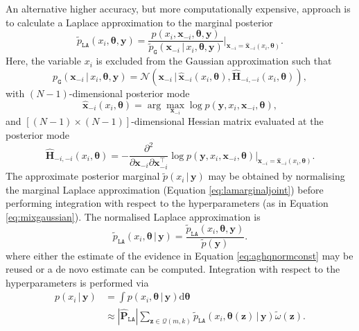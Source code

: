 \documentclass[a4paper, nobind]{templates/ociamthesis}
\begin{document}
An alternative higher accuracy, but more computationally expensive, approach is to calculate a Laplace approximation to the marginal posterior
\begin{equation}
\tilde p_\texttt{LA}(x_i, \boldsymbol{\mathbf{\theta}}, \mathbf{y}) = \frac{p(x_i, \mathbf{x}_{-i}, \boldsymbol{\mathbf{\theta}}, \mathbf{y})}{\tilde p_\texttt{G}(\mathbf{x}_{-i} \, | \, x_i, \boldsymbol{\mathbf{\theta}}, \mathbf{y})} \Big\rvert_{\mathbf{x}_{-i} = \hat{\mathbf{x}}_{-i}(x_i, \boldsymbol{\mathbf{\theta}})}. \label{eq:lamarginaljoint}
\end{equation}
Here, the variable \(x_i\) is excluded from the Gaussian approximation such that
\begin{equation}
p_\texttt{G}(\mathbf{x}_{-i} \, | \, x_i, \boldsymbol{\mathbf{\theta}}, \mathbf{y}) = \mathcal{N}(\mathbf{x}_{-i} \, | \, \hat{\mathbf{x}}_{-i}(x_i, \boldsymbol{\mathbf{\theta}}), \hat{\mathbf{H}}_{-i, -i}(x_i, \boldsymbol{\mathbf{\theta}})),
\end{equation}
with \((N - 1)\)-dimensional posterior mode
\begin{equation}
\hat{\mathbf{x}}_{-i}(x_i, \boldsymbol{\mathbf{\theta}}) = \arg\max_{\mathbf{x}_{-i}} \log p(\mathbf{y}, x_i, \mathbf{x}_{-i}, \boldsymbol{\mathbf{\theta}}),
\end{equation}
and \([(N - 1) \times (N - 1)]\)-dimensional Hessian matrix evaluated at the posterior mode
\begin{equation}
\hat{\mathbf{H}}_{-i, -i}(x_i, \boldsymbol{\mathbf{\theta}}) = - \frac{\partial^2}{\partial \mathbf{x}_{-i} \partial \mathbf{x}_{-i}^\top} \log p(\mathbf{y}, x_i, \mathbf{x}_{-i}, \boldsymbol{\mathbf{\theta}}) \rvert_{\mathbf{x}_{-i} = \hat{\mathbf{x}}_{-i}(x_i, \boldsymbol{\mathbf{\theta}})}.
\end{equation}
The approximate posterior marginal \(\tilde p(x_i \, | \, \mathbf{y})\) may be obtained by normalising the marginal Laplace approximation (Equation \eqref{eq:lamarginaljoint}) before performing integration with respect to the hyperparameters (as in Equation \eqref{eq:mixgaussian}).
The normalised Laplace approximation is
\begin{equation}
\tilde p_\texttt{LA}(x_i, \boldsymbol{\mathbf{\theta}} \, | \, \mathbf{y}) = \frac{\tilde p_\texttt{LA}(x_i, \boldsymbol{\mathbf{\theta}}, \mathbf{y})}{\tilde p(\mathbf{y})}.
\end{equation}
where either the estimate of the evidence in Equation \eqref{eq:aghqnormconst} may be reused or a de novo estimate can be computed.
Integration with respect to the hyperparameters is performed via
\begin{align}
p(x_i \, | \, \mathbf{y}) &= \int p(x_i, \boldsymbol{\mathbf{\theta}} \, | \, \mathbf{y}) \text{d} \boldsymbol{\mathbf{\theta}} \\
&\approx |\hat{\mathbf{P}}_\texttt{LA}| \sum_{\mathbf{z} \in \mathcal{Q}(m, k)} \tilde p_\texttt{LA}(x_i, \boldsymbol{\mathbf{\theta}}(\mathbf{z}) \, | \, \mathbf{y}) \tilde \omega(\mathbf{z}). \label{eq:lamarginal}
\end{align}
\end{document}
